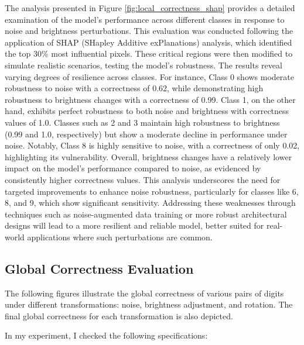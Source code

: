 The analysis presented in Figure \ref{fig:local_correctness_shap} provides a detailed examination of the model's performance across different classes in response to noise and brightness perturbations. This evaluation was conducted following the application of SHAP (SHapley Additive exPlanations) analysis, which identified the top 30\% most influential pixels. These critical regions were then modified to simulate realistic scenarios, testing the model's robustness. The results reveal varying degrees of resilience across classes. For instance, Class 0 shows moderate robustness to noise with a correctness of 0.62, while demonstrating high robustness to brightness changes with a correctness of 0.99. Class 1, on the other hand, exhibits perfect robustness to both noise and brightness with correctness values of 1.0. Classes such as 2 and 3 maintain high robustness to brightness (0.99 and 1.0, respectively) but show a moderate decline in performance under noise. Notably, Class 8 is highly sensitive to noise, with a correctness of only 0.02, highlighting its vulnerability. Overall, brightness changes have a relatively lower impact on the model's performance compared to noise, as evidenced by consistently higher correctness values. This analysis underscores the need for targeted improvements to enhance noise robustness, particularly for classes like 6, 8, and 9, which show significant sensitivity. Addressing these weaknesses through techniques such as noise-augmented data training or more robust architectural designs will lead to a more resilient and reliable model, better suited for real-world applications where such perturbations are common.
\subsection{Global Correctness Evaluation}
The following figures illustrate the global correctness of various pairs of digits under different transformations: noise, brightness adjustment, and rotation. The final global correctness for each transformation is also depicted.

In my experiment, I checked the following specifications:

  


